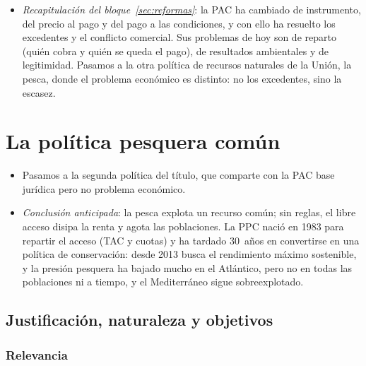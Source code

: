 \documentclass[11pt]{article}
\begin{document}
\begin{itemize}
\item \emph{Recapitulación del bloque~\ref{sec:reformas}}: la PAC ha cambiado de instrumento, del precio al pago y del pago a las condiciones, y con ello ha resuelto los excedentes y el conflicto comercial. Sus problemas de hoy son de reparto (quién cobra y quién se queda el pago), de resultados ambientales y de legitimidad. Pasamos a la otra política de recursos naturales de la Unión, la pesca, donde el problema económico es distinto: no los excedentes, sino la escasez.
\end{itemize}

\section{La política pesquera común}\label{sec:ppc}

\begin{itemize}
\item Pasamos a la segunda política del título, que comparte con la PAC base jurídica pero no problema económico.
\item \emph{Conclusión anticipada}: la pesca explota un recurso común; sin reglas, el libre acceso disipa la renta y agota las poblaciones. La PPC nació en 1983 para repartir el acceso (TAC y cuotas) y ha tardado 30~años en convertirse en una política de conservación: desde 2013 busca el rendimiento máximo sostenible, y la presión pesquera ha bajado mucho en el Atlántico, pero no en todas las poblaciones ni a tiempo, y el Mediterráneo sigue sobreexplotado.
\end{itemize}

\subsection{Justificación, naturaleza y objetivos}\label{sec:justificacion-ppc}

\subsubsection{Relevancia}\label{sec:relevancia-ppc}
\end{document}
